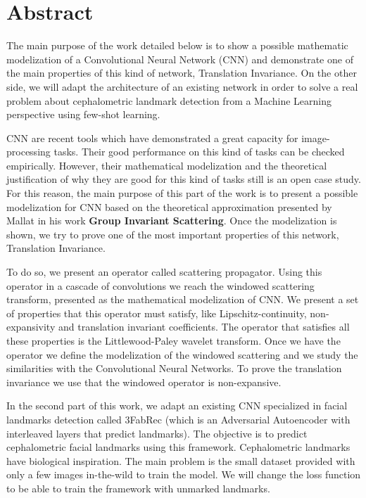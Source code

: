 %

\chapter{Abstract}

\noindent The main purpose of the work detailed below is to show a possible mathematic modelization of a Convolutional Neural Network (CNN) and demonstrate one of the main properties of this kind of network, Translation Invariance.  On the other side, we will adapt the architecture of an existing network in order to solve a real problem about cephalometric landmark detection from a Machine Learning perspective using few-shot learning.

\medskip

\noindent CNN are recent tools which have demonstrated a great capacity for image-processing tasks. Their good performance on this kind of tasks can be checked empirically. However, their mathematical modelization and the theoretical justification of why they are good for this kind of tasks still is an open case study. For this reason, the main purpose of this part of the work is to present a possible modelization for CNN based on the theoretical approximation presented by Mallat in his work \textbf{Group Invariant Scattering}. Once the modelization is shown, we try to prove one of the most important properties of this network, Translation Invariance.

\medskip

\noindent To do so, we present an operator called scattering propagator. Using this operator in a cascade of convolutions we reach the windowed scattering transform, presented as the mathematical modelization of CNN. We present a set of properties that this operator must satisfy, like Lipschitz-continuity, non-expansivity and translation invariant coefficients. The operator that satisfies all these properties is the Littlewood-Paley wavelet transform. Once we have the operator we define the modelization of the windowed scattering and we study the similarities with the Convolutional Neural Networks. To prove the translation invariance we use that the windowed operator is non-expansive.

\medskip

\noindent In the second part of this work, we adapt an existing CNN specialized in facial landmarks detection called 3FabRec (which is an Adversarial Autoencoder with interleaved layers that predict landmarks). The objective is to predict cephalometric facial landmarks using this framework. Cephalometric landmarks have biological inspiration. The main problem is the small dataset provided with only a few images in-the-wild to train the model. We will change the loss function to be able to train the framework with unmarked landmarks.

